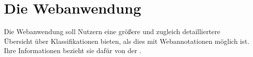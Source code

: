 \section{Die Webanwendung}
    Die Webanwendung soll Nutzern eine größere und zugleich detailliertere
    Übersicht über Klassifikationen bieten,
    als dies mit Webannotationen möglich ist.
    Ihre Informationen bezieht sie dafür von der
    {\classificationStorageAPI}.

    
    